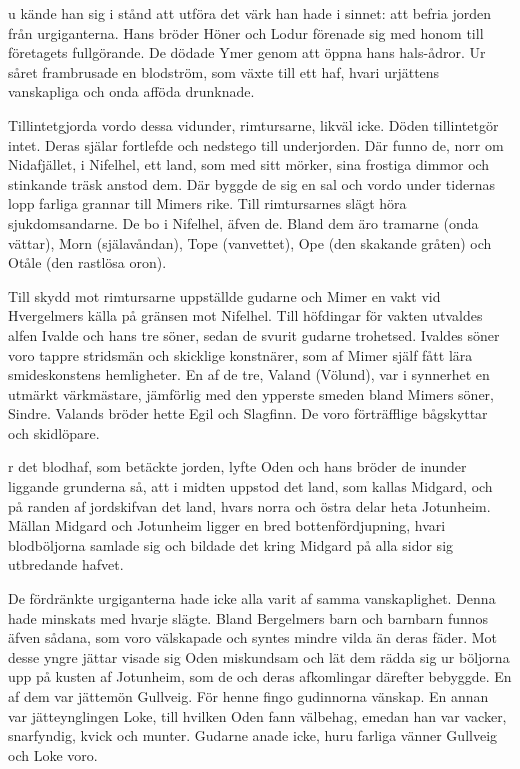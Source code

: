 
\dropcapN u kände han sig i stånd att utföra det värk han hade i sinnet: att
befria jorden från urgiganterna. Hans bröder Höner och Lodur förenade
sig med honom till företagets fullgörande. De dödade Ymer genom att
öppna hans hals-ådror. Ur såret frambrusade en blodström, som växte till
ett haf, hvari urjättens vanskapliga och onda afföda drunknade.

Tillintetgjorda vordo dessa vidunder, rimtursarne, likväl icke. Döden
tillintetgör intet. Deras själar fortlefde och nedstego till
underjorden. Där funno de, norr om Nidafjället, i Nifelhel, ett land,
som med sitt mörker, sina frostiga dimmor och stinkande träsk anstod
dem. Där byggde de sig en sal och vordo under tidernas lopp farliga
grannar till Mimers rike. Till rimtursarnes slägt höra sjukdomsandarne.
De bo i Nifelhel, äfven de. Bland dem äro tramarne (onda vättar), Morn
(själavåndan), Tope (vanvettet), Ope (den skakande gråten) och Otåle
(den rastlösa oron).

Till skydd mot rimtursarne uppställde gudarne och Mimer en vakt vid
Hvergelmers källa på gränsen mot Nifelhel. Till höfdingar för vakten
utvaldes alfen Ivalde och hans tre söner, sedan de svurit gudarne
trohetsed. Ivaldes söner voro tappre stridsmän och skicklige konstnärer,
som af Mimer själf fått lära smideskonstens hemligheter. En af de tre,
Valand (Völund), var i synnerhet en utmärkt värkmästare, jämförlig
med den ypperste smeden bland Mimers söner, Sindre. Valands bröder hette
Egil och Slagfinn. De voro förträfflige bågskyttar och skidlöpare.



\dropcapU r det blodhaf, som betäckte jorden, lyfte Oden och hans bröder de
inunder liggande grunderna så, att i midten uppstod det land, som kallas
Midgard, och på randen af jordskifvan det land, hvars norra och östra
delar heta Jotunheim. Mällan Midgard och Jotunheim ligger en bred
bottenfördjupning, hvari blodböljorna samlade sig och bildade det kring
Midgard på alla sidor sig utbredande hafvet.

De fördränkte urgiganterna hade icke alla varit af samma vanskaplighet.
Denna hade minskats med hvarje slägte. Bland Bergelmers barn och
barnbarn funnos äfven sådana, som voro välskapade och syntes mindre
vilda än deras fäder. Mot desse yngre jättar visade sig Oden miskundsam
och lät dem rädda sig ur böljorna upp på kusten af Jotunheim, som de och
deras afkomlingar därefter bebyggde. En af dem var jättemön Gullveig.
För henne fingo gudinnorna vänskap. En annan var jätteynglingen Loke,
till hvilken Oden fann välbehag, emedan han var vacker, snarfyndig,
kvick och munter. Gudarne anade icke, huru farliga vänner Gullveig och
Loke voro.

